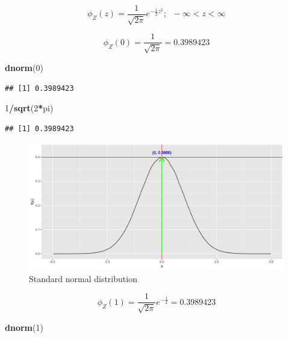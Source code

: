 \documentclass[]{book}
\newenvironment{Shaded}{\begin{snugshade}}{\end{snugshade}}
\newcommand{\DecValTok}[1]{\textcolor[rgb]{0.00,0.00,0.81}{#1}}
\newcommand{\KeywordTok}[1]{\textcolor[rgb]{0.13,0.29,0.53}{\textbf{#1}}}
\newcommand{\NormalTok}[1]{#1}
\newcommand{\OperatorTok}[1]{\textcolor[rgb]{0.81,0.36,0.00}{\textbf{#1}}}
\begin{document}
\[\phi_Z(z) = \frac{1}{\sqrt{2 \pi}}e^{-\frac{1}{2}z^2};\;\; -\infty< z< \infty\]

\[\phi_Z(0) = \frac{1}{\sqrt{2 \pi}} =  0.3989423\]

\begin{Shaded}
\begin{Highlighting}[]
\KeywordTok{dnorm}\NormalTok{(}\DecValTok{0}\NormalTok{)}
\end{Highlighting}
\end{Shaded}

\begin{verbatim}
## [1] 0.3989423
\end{verbatim}

\begin{Shaded}
\begin{Highlighting}[]
\DecValTok{1}\OperatorTok{/}\KeywordTok{sqrt}\NormalTok{(}\DecValTok{2}\OperatorTok{*}\NormalTok{pi)}
\end{Highlighting}
\end{Shaded}

\begin{verbatim}
## [1] 0.3989423
\end{verbatim}

\begin{figure}

{\centering \includegraphics{figure/norm4-1} 

}

\caption{Standard normal distribution}\label{fig:norm4}
\end{figure}

\[\phi_Z(1) = \frac{1}{\sqrt{2 \pi}}e^{-\frac{1}{2}} =  0.3989423\]

\begin{Shaded}
\begin{Highlighting}[]
\KeywordTok{dnorm}\NormalTok{(}\DecValTok{1}\NormalTok{)}
\end{Highlighting}
\end{Shaded}
\end{document}
